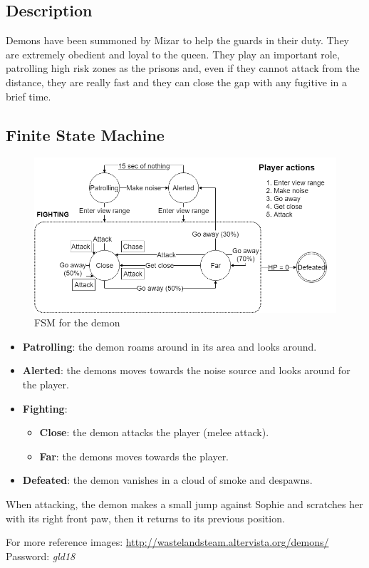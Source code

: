 \subsection{Description}
Demons have been summoned by Mizar to help the guards in their duty. They are extremely obedient and loyal to the queen. They play an important role, patrolling high risk zones as the prisons and, even if they cannot attack from the distance, they are really fast and they can close the gap with any fugitive in a brief time.

\subsection{Finite State Machine}
\begin{figure}[H]
  \centering
  \includegraphics[width=\textwidth]{Images/Diagrams/FSMs/demonFSM}
  \caption{FSM for the demon}
\end{figure}

\begin{itemize}
	\item \textbf{Patrolling}: the demon roams around in its area and looks around.
	\item \textbf{Alerted}: the demons moves towards the noise source and looks around for the player.
	\item \textbf{Fighting}:
	\begin{itemize}
		\item \textbf{Close}: the demon attacks the player (melee attack).
		\item \textbf{Far}: the demons moves towards the player.
	\end{itemize}
	\item \textbf{Defeated}: the demon vanishes in a cloud of smoke and despawns.
\end{itemize}

When attacking, the demon makes a small jump against Sophie and scratches her with its right front paw, then it returns to its previous position.

For more reference images: \url{http://wastelandsteam.altervista.org/demons/}\\
Password: \textit{gld18}
